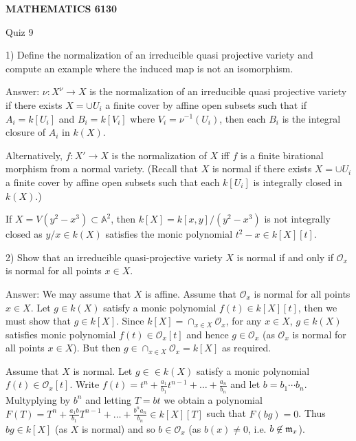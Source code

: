 \documentclass[12pt]{amsart}
\begin{document}
\bigskip\bigskip\bigskip\bigskip
\centerline{\bf MATHEMATICS 6130}
\centerline{Quiz 9}
1) Define the normalization of an irreducible quasi projective variety and compute an example where the induced map is not an isomorphism.

Answer: $\nu : X^\nu \to X$ is the normalization of an irreducible quasi projective variety if there exists
$X=\cup U_i$ a finite cover by affine open subsets such that if $A_i=k[U_i]$ and $B_i=k[V_i]$ where $V_i=\nu ^{-1}(U_i)$, then each $B_i$ is the integral closure of $A_i$ in $k(X)$.

Alternatively, $f:X'\to X$  is the normalization of $X$ iff $f$ is a finite birational morphism from a normal variety. (Recall that $X$ is normal if there exists
$X=\cup U_i$ a finite cover by affine open subsets such that each $k[U_i]$ is integrally closed in $k(X)$.)

If $X=V(y^2-x^3)\subset \mathbb A ^2$, then $k[X]=k[x,y]/(y^2-x^3)$ is not integrally closed as $y/x\in k(X)$ satisfies the monic polynomial $t^2-x\in k[X][t]$. 

2) Show that an irreducible quasi-projective variety $X$ is normal if and only if $\mathcal O _x$ is normal for all points $x\in X$.

Answer: We may assume that $X$ is affine. Assume that $\mathcal O _x$ is normal for all points $x\in X$. Let $g\in k(X)$ satisfy a monic polynomial $f(t)\in k[X][t]$, then we must show that $g\in k[X]$.
Since $k[X]=\cap _{x\in X}\mathcal O _x$, for any $x\in X$, $g\in k(X)$ satisfies monic polynomial $f(t)\in \mathcal O _x[t]$ and hence $g\in \mathcal O _x$ (as 
$\mathcal O _x$ is normal for all points $x\in X$). But then $g\in \cap _{x\in X}\mathcal O _x=k[X]$ as required.

Assume that $X$ is normal. Let $g\in \in k(X)$ satisfy a monic polynomial $f(t)\in \mathcal O _x[t]$. Write $f(t)=t^n+\frac {a_1}{b_1}t^{n-1}+\ldots +\frac {a_n}{b_n}$ and let $b=b_1\cdots b_n$. Multyplying by $b^n$ and letting $T=bt$
we obtain a polynomial
$F(T)=T^n+\frac {a_1b}{b_1}T^{n-1}+\ldots + \frac {b^na_n}{b_n}\in k[X][T]$ such that $F(bg)=0$. Thus $bg\in k[X]$ (as $X$ is normal) and so $b\in \mathcal O _x$ (as $b(x)\ne 0$, i.e. $b\not\in \frak m _x$).
\end{document}
